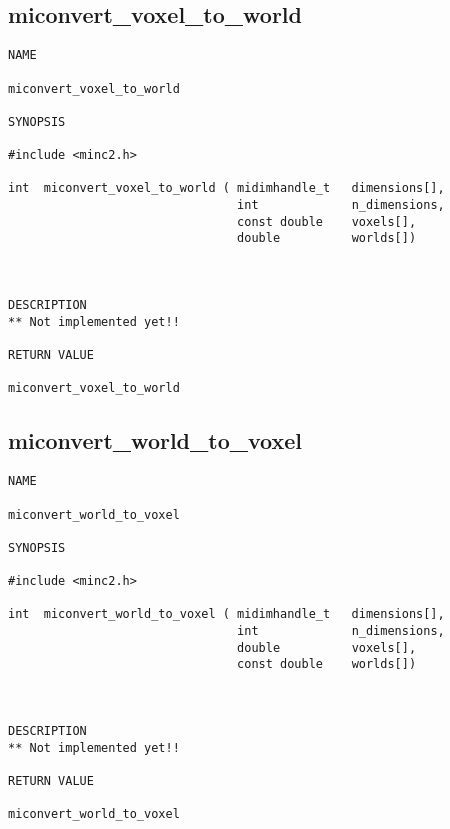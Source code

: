 \documentclass{article}
\begin{document}
\subsection{miconvert\_voxel\_to\_world}
\begin{verbatim}
NAME 

miconvert_voxel_to_world

SYNOPSIS

#include <minc2.h>

int  miconvert_voxel_to_world ( midimhandle_t   dimensions[],
                                int             n_dimensions,
                                const double    voxels[],
                                double          worlds[])
                                   
                       
                                
DESCRIPTION
** Not implemented yet!!

RETURN VALUE

miconvert_voxel_to_world
\end{verbatim}

\subsection{miconvert\_world\_to\_voxel}
\begin{verbatim}
NAME 

miconvert_world_to_voxel

SYNOPSIS

#include <minc2.h>

int  miconvert_world_to_voxel ( midimhandle_t   dimensions[],
                                int             n_dimensions,
                                double          voxels[],
                                const double    worlds[])
                                   
                       
                                
DESCRIPTION
** Not implemented yet!!

RETURN VALUE

miconvert_world_to_voxel
\end{verbatim}
\end{document}
